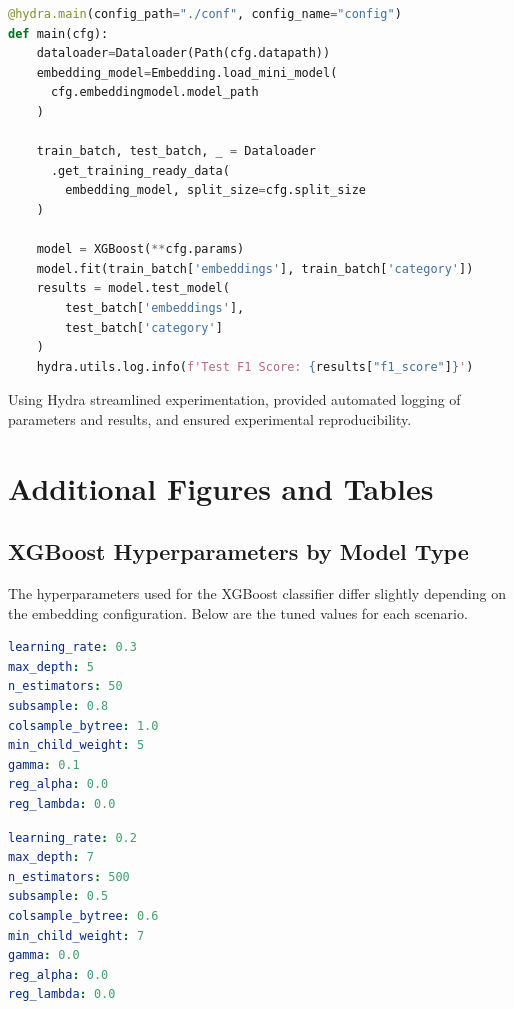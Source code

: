 \documentclass{SGGW-thesis-EN}
\begin{document}
\begin{lstlisting}[language=Python, caption={Training pipeline}, label={lst:preprocessing}]
@hydra.main(config_path="./conf", config_name="config")
def main(cfg):
    dataloader=Dataloader(Path(cfg.datapath))
    embedding_model=Embedding.load_mini_model(
      cfg.embeddingmodel.model_path
    )

    train_batch, test_batch, _ = Dataloader
      .get_training_ready_data(
        embedding_model, split_size=cfg.split_size
    )

    model = XGBoost(**cfg.params)
    model.fit(train_batch['embeddings'], train_batch['category'])
    results = model.test_model(
        test_batch['embeddings'], 
        test_batch['category']
    )
    hydra.utils.log.info(f'Test F1 Score: {results["f1_score"]}')
\end{lstlisting}
\label{code:hydra_pipeline_example}
\noindent Using Hydra streamlined experimentation, provided automated logging of parameters and results, and ensured experimental reproducibility.



\section{Additional Figures and Tables}
\subsection{XGBoost Hyperparameters by Model Type}

\noindent The hyperparameters used for the XGBoost classifier differ slightly depending on the embedding configuration.
Below are the tuned values for each scenario.

\begin{lstlisting}[language=yaml, caption={XGBoost hyperparameters – BERT model}, label={lst:bert_params}]
learning_rate: 0.3
max_depth: 5
n_estimators: 50
subsample: 0.8
colsample_bytree: 1.0
min_child_weight: 5
gamma: 0.1
reg_alpha: 0.0
reg_lambda: 0.0
\end{lstlisting}

\begin{lstlisting}[language=yaml, caption={XGBoost hyperparameters – Sentence-Transformer (GPT + real fine-tuned)}, label={lst:gpt_real_params}]
learning_rate: 0.2
max_depth: 7
n_estimators: 500
subsample: 0.5
colsample_bytree: 0.6
min_child_weight: 7
gamma: 0.0
reg_alpha: 0.0
reg_lambda: 0.0
\end{lstlisting}
\end{document}
